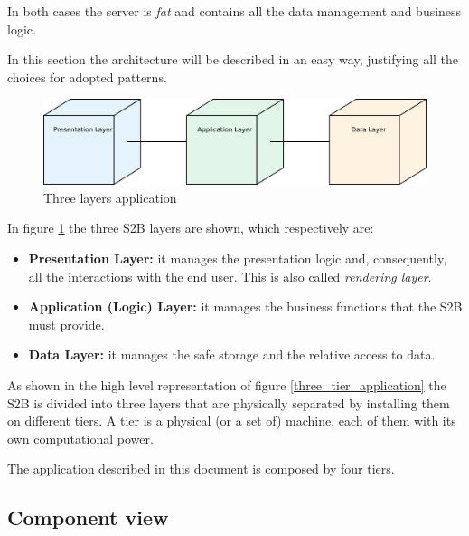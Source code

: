 In both cases the server is \textit{fat} and contains all the data management and business logic.

In this section the architecture will be described in an easy way, justifying all the choices for adopted patterns.

\begin{figure}[H]
    \begin{center}
        \includegraphics[width=\textwidth]{img/3-tier.png}
        \caption{Three layers application}\label{three_tier_desc}
    \end{center}
\end{figure}

In figure \ref{three_tier_desc} the three S2B layers are shown, which respectively are:
\begin{itemize}
    \item \textbf{Presentation Layer:} it manages the presentation logic and, consequently, all the interactions with the end user. This is also called \textit{rendering layer}.
    \item \textbf{Application (Logic) Layer:} it manages the business functions that the S2B must provide.
    \item \textbf{Data Layer:} it manages the safe storage and the relative access to data.
\end{itemize}

As shown in the high level representation of figure \ref{three_tier_application} the S2B is divided into three layers that are physically separated by installing them on different tiers. A tier is a physical (or a set of) machine, each of them with its own computational power.

The application described in this document is composed by four tiers.



\subsection{Component view}
